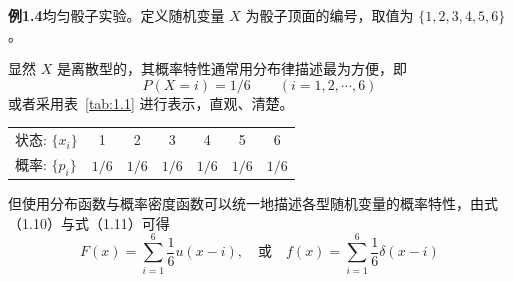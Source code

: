 \documentclass[11pt,openany,UTF8]{ctexbook}
\begin{document}
\begin{examplebox}
\textbf{例1.4}\quad 均匀骰子实验\nobreak。定义随机变量 $X$ 为骰子顶面的编号\nobreak，取值为 $\{1,2,3,4,5,6\}$\nobreak。

显然 $X$ 是离散型的\nobreak，其概率特性通常用分布律描述最为方便\nobreak，即
\[
P(X=i)=1/6\qquad (i=1,2,\cdots,6)
\]
或者采用表~\ref{tab:1.1} 进行表示\nobreak，直观\nobreak、清楚\nobreak。

\begin{center}
  \label{tab:1.1}

  \smallskip
  \begin{tabular}{lcccccc}
    \toprule
    状态: $\{x_i\}$ & 1 & 2 & 3 & 4 & 5 & 6 \\
    概率: $\{p_i\}$ & $1/6$ & $1/6$ & $1/6$ & $1/6$ & $1/6$ & $1/6$ \\
    \bottomrule
  \end{tabular}
\end{center}

但使用分布函数与概率密度函数可以统一地描述各型随机变量的概率特性\nobreak，由式（1.10\nobreak）与式（1.11\nobreak）可得
\[
F(x)=\sum_{i=1}^{6}\frac{1}{6}u(x-i),\quad\text{或}\quad f(x)=\sum_{i=1}^{6}\frac{1}{6}\delta(x-i)
\]
\end{examplebox}


\end{document}
